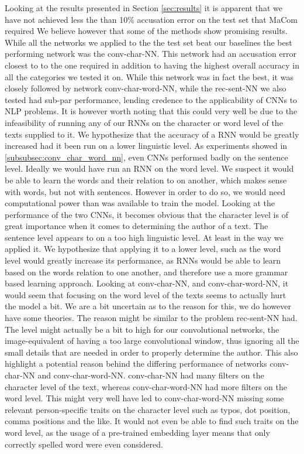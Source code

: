 Looking at the results presented in Section \ref{sec:results} it is apparent
that we have not achieved less the than 10\% accusation error on the test
set that MaCom required We believe however that some of the methods show
promising results. While all the networks we applied to the the test set beat
our baselines the best performing network was the \gls{conv-char-NN}. This
network had an accusation error closest to to the one required in addition to
having the highest overall accuracy in all the categories we tested it on.
While this network was in fact the best, it was closely followed by network
\gls{conv-char-word-NN}, while the \gls{rec-sent-NN} we also tested had sub-par
performance, lending credence to the applicability of \glspl{CNN} to \gls{NLP}
problems. It is however worth noting that this could very well be due to the
infeasibility of running any of our \glspl{RNN} on the character or word level
of the texts supplied to it. We hypothesize that the accuracy of a RNN would be
greatly increased had it been run on a lower linguistic level. As experiments
showed in \ref{subsubsec:conv_char_word_nn}, even \gls{CNN}s performed badly on the
sentence level. Ideally we would have run an RNN on the word level. We suspect
it would be able to learn the words and their relation to on another, which
makes sense with words, but not with sentences. However in order to do so, we
would need computational power than was available to train the model. Looking at
the performance of the two \glspl{CNN}, it becomes obvious that the character
level is of great importance when it comes to determining the author of a text.
The sentence level appears to on a too high linguistic level. At least in the
way we applied it. We hypothesize that applying it to a lower level, such as
the word level would greatly increase its performance, as \glspl{RNN} would
be able to learn based on the words relation to one another, and therefore
use a more grammar based learning approach. Looking at \gls{conv-char-NN},
and \gls{conv-char-word-NN}, it would seem that focusing on the word level of
the texts seems to actually hurt the model a bit. We are a bit uncertain as
to the reason for this, we do however have some theories. The reason might be
similar to the problem \gls{rec-sent-NN} had. The level might actually be a bit
to high for our convolutional networks, the image-equivalent of having a too
large convolutional window, thus ignoring all the small details that are needed
in order to properly determine the author. This also highlight a potential
reason behind the differing performance of networks \gls{conv-char-NN} and
\gls{conv-char-word-NN}. \gls{conv-char-NN} had many filters on the character
level of the text, whereas \gls{conv-char-word-NN} had more filters on the
word level. This might very well have led to \gls{conv-char-word-NN} missing
some relevant person-specific traits on the character level such as typos, dot
position, comma positions and the like. It would not even be able to find such
traits on the word level, as the usage of a pre-trained embedding layer means
that only correctly spelled word were even considered.

